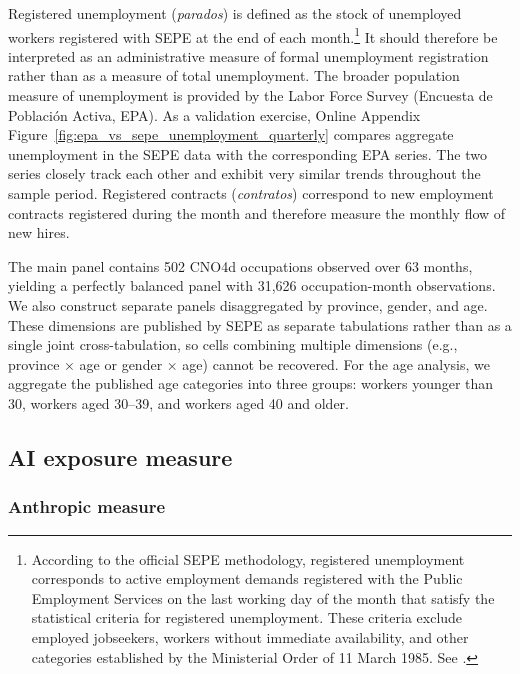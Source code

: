 \documentclass[11pt]{article}
\begin{document}
Registered unemployment (\textit{parados}) is defined as the stock of unemployed workers registered with SEPE at the end of each month.\footnote{According to the official SEPE methodology, registered unemployment corresponds to active employment demands registered with the Public Employment Services on the last working day of the month that satisfy the statistical criteria for registered unemployment. These criteria exclude employed jobseekers, workers without immediate availability, and other categories established by the Ministerial Order of 11 March 1985. See \citet{mites_mlr_methodology}.} It should therefore be interpreted as an administrative measure of formal unemployment registration rather than as a measure of total unemployment. The broader population measure of unemployment is provided by the Labor Force Survey (Encuesta de Poblaci\'on Activa, EPA). As a validation exercise, Online Appendix Figure~\ref{fig:epa_vs_sepe_unemployment_quarterly} compares aggregate unemployment in the SEPE data with the corresponding EPA series. The two series closely track each other and exhibit very similar trends throughout the sample period. Registered contracts (\textit{contratos}) correspond to new employment contracts registered during the month and therefore measure the monthly flow of new hires.

The main panel contains 502 CNO4d occupations observed over 63 months, yielding a perfectly balanced panel with 31,626 occupation-month observations. We also construct separate panels disaggregated by province, gender, and age. These dimensions are published by SEPE as separate tabulations rather than as a single joint cross-tabulation, so cells combining multiple dimensions (e.g., province $\times$ age or gender $\times$ age) cannot be recovered. For the age analysis, we aggregate the published age categories into three groups: workers younger than 30, workers aged 30--39, and workers aged 40 and older.


\subsection{AI exposure measure \label{sec:mapping}}

\subsubsection{Anthropic measure}
\end{document}
